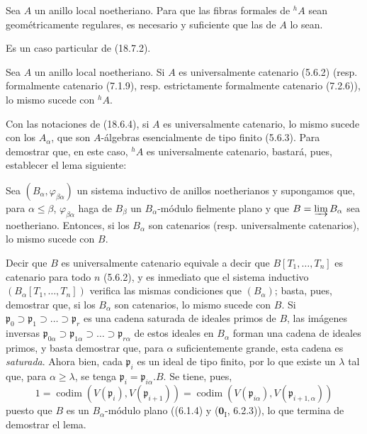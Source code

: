 \begin{corollary}[18.7.4]
\label{IV.18.7.4}
Sea $A$ un anillo local noetheriano. Para que las fibras formales de ${}^h\!A$ sean geométricamente regulares, es necesario y suficiente que las de $A$ lo sean.
\end{corollary}

Es un caso particular de (18.7.2).

\begin{proposition}[18.7.5]
\label{IV.18.7.5}
Sea $A$ un anillo local noetheriano. Si $A$ es universalmente catenario \textup{(5.6.2) (resp.} formalmente catenario \textup{(7.1.9), resp.} estrictamente formalmente catenario \textup{(7.2.6))}, lo mismo sucede con ${}^h\!A$.
\end{proposition}

Con las notaciones de (18.6.4), si $A$ es universalmente catenario, lo mismo sucede con los $A_\alpha$, que son $A$-álgebras esencialmente de tipo finito (5.6.3). Para demostrar que, en este caso, ${}^h\!A$ es universalmente catenario, bastará, pues, establecer el lema siguiente:

\begin{lemma}[18.7.5.1]
\label{IV.18.7.5.1}
Sea $(B_\alpha,\varphi_{\beta\alpha})$ un sistema inductivo de anillos noetherianos y supongamos que, para $\alpha\leq\beta$, $\varphi_{\beta\alpha}$ haga de $B_\beta$ un $B_\alpha$-módulo fielmente plano y que $B=\varinjlim B_\alpha$ sea noetheriano. Entonces, si los $B_\alpha$ son catenarios \textup{(resp.} universalmente catenarios\textup{)}, lo mismo sucede con $B$.
\end{lemma}

Decir que $B$ es universalmente catenario equivale a decir que $B[T_1,\ldots,T_n]$ es catenario para todo $n$ (5.6.2), y es inmediato que el sistema inductivo $(B_\alpha[T_1,\ldots,T_n])$ verifica las mismas condiciones que $(B_\alpha)$; basta, pues, demostrar que, si los $B_\alpha$ son catenarios, lo mismo sucede con $B$. Si $\mathfrak p_0\supset\mathfrak p_1\supset\ldots\supset\mathfrak p_r$ es una cadena saturada de ideales primos de $B$, las imágenes inversas $\mathfrak p_{0\alpha}\supset\mathfrak p_{1\alpha}\supset\ldots\supset\mathfrak p_{r\alpha}$ de estos ideales en $B_\alpha$ forman una cadena de ideales primos, y basta demostrar que, para $\alpha$ suficientemente grande, esta cadena es \emph{saturada}. Ahora bien, cada $\mathfrak p_i$ es un ideal de tipo finito, por lo que existe un $\lambda$ tal que, para $\alpha\geq\lambda$, se tenga $\mathfrak p_i=\mathfrak p_{i\alpha}.B$. Se tiene, pues,
\[
1=\operatorname{codim}(V(\mathfrak p_i),V(\mathfrak p_{i+1}))
=\operatorname{codim}(V(\mathfrak p_{i\alpha}),V(\mathfrak p_{i+1,\alpha}))
\]
puesto que $B$ es un $B_\alpha$-módulo plano ((6.1.4) y ($\mathbf 0_{\mathrm I}$, 6.2.3)), lo que termina de demostrar el lema.

